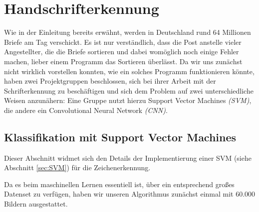 \section{Handschrifterkennung}

Wie in der Einleitung bereits erwähnt, werden in Deutschland rund 64 Millionen Briefe am Tag verschickt. Es ist nur verständlich, dass die Post anstelle vieler Angestellter, die die Briefe sortieren und dabei womöglich noch einige Fehler machen, lieber einem Programm das Sortieren überlässt. Da wir uns zunächst nicht wirklich vorstellen konnten, wie ein solches Programm funktionieren könnte, haben zwei Projektgruppen beschlossen, sich bei ihrer Arbeit mit der Schrifterkennung zu beschäftigen und sich dem Problem auf zwei unterschiedliche Weisen anzunähern: Eine Gruppe nutzt hierzu Support Vector Machines \textit{(SVM)}, die andere ein Convolutional Neural Network \textit{(CNN)}.


\subsection{Klassifikation mit Support Vector Machines}

Dieser Abschnitt widmet sich den Details der Implementierung einer SVM (siehe Abschnitt \ref{sec:SVM}) f\"ur die Zeichenerkennung. 

Da es beim maschinellen Lernen essentiell ist, über ein entsprechend großes Datenset zu verfügen, haben wir unseren Algorithmus zunächst einmal mit 60.000 Bildern ausgestattet. 


